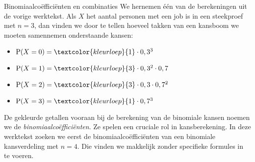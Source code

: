 \clearpage
\begin{lesactiviteit}{Binomiaalcoëfficiënten en combinaties}   
    We hernemen één van de berekeningen uit de vorige werktekst. Als $X$ het aantal personen met een job is in een steekproef met $n=3$, dan vinden we door te tellen hoeveel takken van een kansboom we moeten samennemen onderstaande kansen:
    \begin{itemize}
        \item $\textrm{P}(X=0)=\textcolor{kleurloep}{1} \cdot 0,3 ^3$
	\item $\textrm{P}(X=1)=\textcolor{kleurloep}{3} \cdot 0,3^2 \cdot 0,7$
	\item $\textrm{P}(X=2)=\textcolor{kleurloep}{3} \cdot 0,3 \cdot 0,7^2$
	\item $\textrm{P}(X=3)=\textcolor{kleurloep}{1} \cdot 0,7^3$
    \end{itemize}

    De gekleurde getallen vooraan bij de berekening van de binomiale kansen noemen we de \emph{binomiaalcoëfficiënten}. Ze spelen een cruciale rol in kansberekening. In deze werktekst zoeken we eerst de binomiaalcoëfficiënten van een binomiale kansverdeling met $n=4$. Die vinden we makkelijk zonder specifieke formules in te voeren.

\begin{vraagenantwoord}
    
    


\end{vraagenantwoord}
\end{lesactiviteit}
